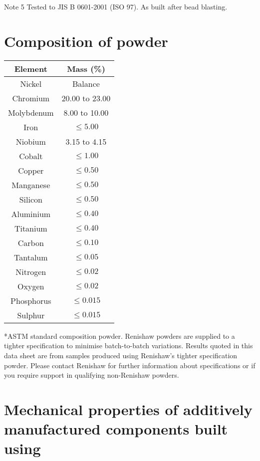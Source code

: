 \documentclass[10pt]{article}
\begin{document}
Note 5 Tested to JIS B 0601-2001 (ISO 97). As built after bead blasting.

\section*{Composition of powder}
\begin{center}
\begin{tabular}{|c|c|}
\hline
Element & Mass (\%) \\
\hline
Nickel & Balance \\
\hline
Chromium & 20.00 to 23.00 \\
\hline
Molybdenum & 8.00 to 10.00 \\
\hline
Iron & $\leq 5.00$ \\
\hline
Niobium & 3.15 to 4.15 \\
\hline
Cobalt & $\leq 1.00$ \\
\hline
Copper & $\leq 0.50$ \\
\hline
Manganese & $\leq 0.50$ \\
\hline
Silicon & $\leq 0.50$ \\
\hline
Aluminium & $\leq 0.40$ \\
\hline
Titanium & $\leq 0.40$ \\
\hline
Carbon & $\leq 0.10$ \\
\hline
Tantalum & $\leq 0.05$ \\
\hline
Nitrogen & $\leq 0.02$ \\
\hline
Oxygen & $\leq 0.02$ \\
\hline
Phosphorus & $\leq 0.015$ \\
\hline
Sulphur & $\leq 0.015$ \\
\hline
\end{tabular}
\end{center}

*ASTM standard composition powder. Renishaw powders are supplied to a tighter specification to minimise batch-to-batch variations. Results quoted in this data sheet are from samples produced using Renishaw's tighter specification powder. Please contact Renishaw for further information about specifications or if you require support in qualifying non-Renishaw powders.

\section*{Mechanical properties of additively manufactured components built using}
\end{document}
